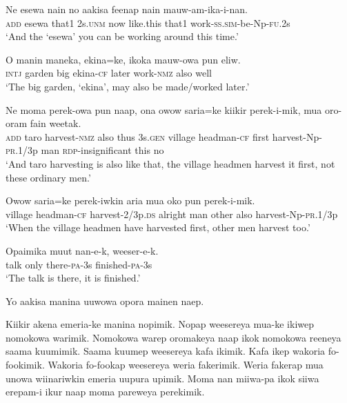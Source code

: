 \ea
\gll  Ne  esewa  nain  no  aakisa  feenap  nain  mauw-am-ika-i-nan. \\
\textsc{add}  esewa  that1  2s.\textsc{unm}  now  like.this  that1  work-\textsc{ss}.\textsc{sim}-be-Np-\textsc{fu}.2s \\
\glt ‘And the ‘esewa’ you can be working around this time.’ \\
\z


\ea
\gll  O  manin  maneka,  ekina=ke,  ikoka  mauw-owa  pun  eliw. \\
\textsc{intj}  garden  big  ekina-\textsc{cf}  later  work-\textsc{nmz}  also  well \\
\glt ‘The big garden, ‘ekina’, may also be made/worked later.’ \\
\z


\ea
\gll  Ne  moma  perek-owa  pun  naap,  ona  owow  saria=ke  kiikir       perek-i-mik,  mua  oro-oram  fain  weetak. \\
\textsc{add}  taro  harvest-\textsc{nmz}  also  thus  3s.\textsc{gen}  village  headman-\textsc{cf}  first   harvest-Np-\textsc{pr}.1/3p  man  \textsc{rdp}-insignificant  this  no \\


\glt ‘And  taro harvesting is also like that, the village headmen harvest it first, not these ordinary men.’ \\
\z


\ea
\gll  Owow  saria=ke  perek-iwkin  aria  mua  oko  pun  perek-i-mik. \\
village  headman-\textsc{cf}  harvest-2/3p.\textsc{ds}  alright  man  other  also  harvest-Np-\textsc{pr}.1/3p \\
\glt ‘When the village headmen have harvested first, other men harvest too.’ \\
\z


\ea
\gll  Opaimika  muut  nan-e-k,  weeser-e-k. \\
talk  only  there-\textsc{pa}-3s  finished-\textsc{pa}-3s \\
\glt ‘The talk is there, it is finished.’ \\
\z

Yo aakisa manina uuwowa opora mainen naep.

Kiikir akena emeria-ke manina nopimik. 
\textrm{Nopap weesereya  mua-ke ikiwep nomokowa warimik. }
\textrm{Nomokowa warep oromakeya naap ikok nomokowa reeneya  saama kuumimik. }
\textrm{Saama kuumep weesereya kafa ikimik. }
\textrm{Kafa ikep wakoria fo-fookimik. }
\textrm{Wakoria fo-fookap weesereya weria fakerimik. }
\textrm{Weria fakerap mua unowa wiinariwkin emeria uupura upimik. }
\textrm{Moma nan miiwa-pa ikok siiwa erepam-i ikur naap moma pareweya perekimik. }

